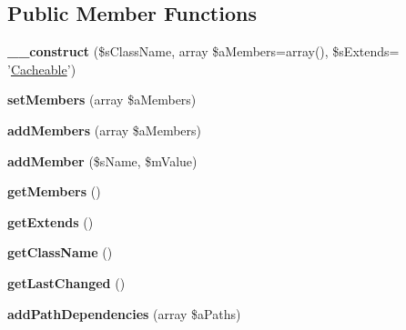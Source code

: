 \subsection*{Public Member Functions}
\begin{DoxyCompactItemize}
\item 
\hypertarget{class_cache_loader_a356c89fef38fb16405b8df5b0b943d8e}{{\bfseries \-\_\-\-\_\-construct} (\$s\-Class\-Name, array \$a\-Members=array(), \$s\-Extends= '\hyperlink{class_cacheable}{Cacheable}')}\label{class_cache_loader_a356c89fef38fb16405b8df5b0b943d8e}

\item 
\hypertarget{class_cache_loader_a89ed2fa8d5922dfe559566382c5772d7}{{\bfseries set\-Members} (array \$a\-Members)}\label{class_cache_loader_a89ed2fa8d5922dfe559566382c5772d7}

\item 
\hypertarget{class_cache_loader_a50d4bb56d46d0960719dd6b43427913f}{{\bfseries add\-Members} (array \$a\-Members)}\label{class_cache_loader_a50d4bb56d46d0960719dd6b43427913f}

\item 
\hypertarget{class_cache_loader_abb21665f0b6fbbd0bfe584f3785f0349}{{\bfseries add\-Member} (\$s\-Name, \$m\-Value)}\label{class_cache_loader_abb21665f0b6fbbd0bfe584f3785f0349}

\item 
\hypertarget{class_cache_loader_aa2cd0a88f5b21c14745c9a20b0302dc5}{{\bfseries get\-Members} ()}\label{class_cache_loader_aa2cd0a88f5b21c14745c9a20b0302dc5}

\item 
\hypertarget{class_cache_loader_abe7a6a239a1cf2cc3d2b7c161ab87e30}{{\bfseries get\-Extends} ()}\label{class_cache_loader_abe7a6a239a1cf2cc3d2b7c161ab87e30}

\item 
\hypertarget{class_cache_loader_a86f6ffbbd910f4fbefd9974d1b293050}{{\bfseries get\-Class\-Name} ()}\label{class_cache_loader_a86f6ffbbd910f4fbefd9974d1b293050}

\item 
\hypertarget{class_cache_loader_af72c1d1d5d2b913f4ac341b4f01ae627}{{\bfseries get\-Last\-Changed} ()}\label{class_cache_loader_af72c1d1d5d2b913f4ac341b4f01ae627}

\item 
\hypertarget{class_cache_loader_a6d6abe17cfa729986cbd3412949c50c4}{{\bfseries add\-Path\-Dependencies} (array \$a\-Paths)}\label{class_cache_loader_a6d6abe17cfa729986cbd3412949c50c4}


\end{DoxyCompactItemize}
